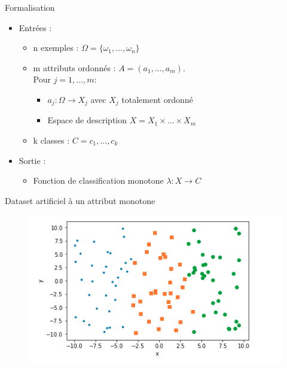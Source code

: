 \documentclass{beamer}
\begin{document}
\begin{frame}{Formalisation}

\begin{itemize}
\item Entrées :  
\begin{itemize}
	\item n exemples : $\Omega = \{\omega_1, ... , \omega_n\}$
    \item m attributs ordonnés : $A = (a_1, ... , a_m)$. \\ Pour $j=1,... ,m :$
    	\begin{itemize}
    	\item $a_j : \Omega \rightarrow X_j$ avec $X_j$ totalement ordonné
        \item Espace de description $X = X_1 \times ... \times X_m$
    	\end{itemize}
    \item k classes : $C = {c_1, ... , c_k}$
\end{itemize}
\item Sortie : 
\begin{itemize}
\item Fonction de classification monotone $\lambda : X \rightarrow C$
\end{itemize}
\end{itemize}

\end{frame}

\begin{frame}{Dataset artificiel à un attribut monotone}

\begin{figure}
	\includegraphics[width=.7\textwidth]{Capture_d__cran_de_2018-07-11_20-06-25.png}
\end{figure}

\end{frame}
\end{document}
